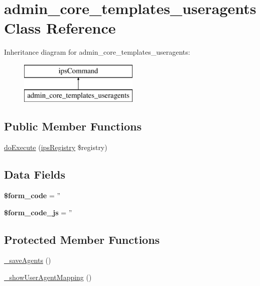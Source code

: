 \hypertarget{classadmin__core__templates__useragents}{\section{admin\-\_\-core\-\_\-templates\-\_\-useragents Class Reference}
\label{classadmin__core__templates__useragents}
}
Inheritance diagram for admin\-\_\-core\-\_\-templates\-\_\-useragents\-:\begin{figure}[H]
\begin{center}
\leavevmode
\includegraphics[height=2.000000cm]{classadmin__core__templates__useragents}
\end{center}
\end{figure}
\subsection*{Public Member Functions}
\begin{DoxyCompactItemize}
\item 
\hyperlink{classadmin__core__templates__useragents_afbc4e912a0604b94d47d66744c64d8ba}{do\-Execute} (\hyperlink{classips_registry}{ips\-Registry} \$registry)
\end{DoxyCompactItemize}
\subsection*{Data Fields}
\begin{DoxyCompactItemize}
\item 
\hypertarget{classadmin__core__templates__useragents_af28aee726fa3eb6c355d08a2ab655e03}{{\bfseries \$form\-\_\-code} = ''}\label{classadmin__core__templates__useragents_af28aee726fa3eb6c355d08a2ab655e03}

\item 
\hypertarget{classadmin__core__templates__useragents_ac68fe8a02a2efd63c3271179f4b4fbb7}{{\bfseries \$form\-\_\-code\-\_\-js} = ''}\label{classadmin__core__templates__useragents_ac68fe8a02a2efd63c3271179f4b4fbb7}

\end{DoxyCompactItemize}
\subsection*{Protected Member Functions}
\begin{DoxyCompactItemize}
\item 
\hyperlink{classadmin__core__templates__useragents_abc4751006e82794f2d8a9509ef452a87}{\-\_\-save\-Agents} ()
\item 
\hyperlink{classadmin__core__templates__useragents_a5bb4d899a411b301fb00a4ddc9cbdf59}{\-\_\-show\-User\-Agent\-Mapping} ()
\end{DoxyCompactItemize}
